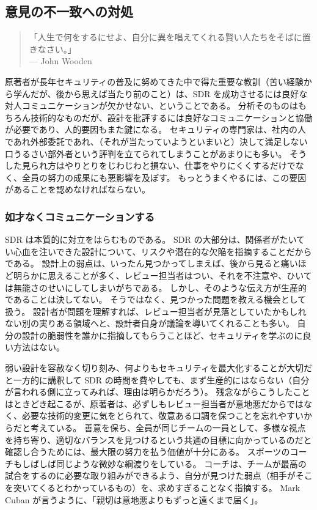 \documentclass[uplatex]{jsarticle}
\begin{document}
\subsection{意見の不一致への対処}

\begin{quote}
「人生で何をするにせよ、自分に異を唱えてくれる賢い人たちをそばに置きなさい。」\\
\hfill --- John Wooden
\end{quote}

原著者が長年セキュリティの普及に努めてきた中で得た重要な教訓（苦い経験から学んだが、後から思えば当たり前のこと）は、SDR を成功させるには良好な対人コミュニケーションが欠かせない、ということである。
分析そのものはもちろん技術的なものだが、設計を批評するには良好なコミュニケーションと協働が必要であり、人的要因もまた鍵になる。
セキュリティの専門家は、社内の人であれ外部委託であれ、（それが当たっていようといまいと）決して満足しない口うるさい部外者という評判を立てられてしまうことがあまりにも多い。
そうした見られ方はやりとりをじわじわと損ない、仕事をやりにくくするだけでなく、全員の努力の成果にも悪影響を及ぼす。
もっとうまくやるには、この要因があることを認めなければならない。

\subsubsection{如才なくコミュニケーションする}

SDR は本質的に対立をはらむものである。
SDR の大部分は、関係者がたいてい心血を注いできた設計について、リスクや潜在的な欠陥を指摘することだからである。
設計上の弱点は、いったん見つかってしまえば、後から見ると痛いほど明らかに思えることが多く、レビュー担当者はつい、それを不注意や、ひいては無能さのせいにしてしまいがちである。
しかし、そのような伝え方が生産的であることは決してない。
そうではなく、見つかった問題を教える機会として扱う。
設計者が問題を理解すれば、レビュー担当者が見落としていたかもしれない別の実りある領域へと、設計者自身が議論を導いてくれることも多い。
自分の設計の脆弱性を誰かに指摘してもらうことほど、セキュリティを学ぶのに良い方法はない。

弱い設計を容赦なく切り刻み、何よりもセキュリティを最大化することが大切だと一方的に講釈して SDR の時間を費やしても、まず生産的にはならない（自分が言われる側に立ってみれば、理由は明らかだろう）。
残念ながらこうしたことはときどき起こるが、原著者は、必ずしもレビュー担当者が意地悪だからではなく、必要な技術的変更に気をとられて、敬意ある口調を保つことを忘れやすいからだと考えている。
善意を保ち、全員が同じチームの一員として、多様な視点を持ち寄り、適切なバランスを見つけるという共通の目標に向かっているのだと確認し合うためには、最大限の努力を払う価値が十分にある。
スポーツのコーチもしばしば同じような微妙な綱渡りをしている。
コーチは、チームが最高の試合をするのに必要な取り組みができるよう、自分が見つけた弱点（相手がそこを突いてくるとわかっているもの）を、求めすぎることなく指摘する。
Mark Cuban が言うように、「親切は意地悪よりもずっと遠くまで届く」。
\end{document}
